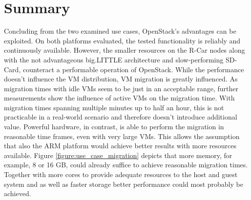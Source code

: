     \section{Summary}
        
        \noindent Concluding from the two examined use cases, OpenStack's advantages can be exploited.
        On both platforms evaluated, the tested functionality is reliably and continuously available.
        However, the smaller resources on the R-Car nodes along with the not advantageous big.LITTLE architecture and slow-performing SD-Card, counteract a performable operation of OpenStack.
        While the performance doesn't influence the VM distribution, VM migration is greatly influenced.
        As migration times with idle VMs seem to be just in an acceptable range, further measurements show the influence of active VMs on the migration time.
        With migration times spanning multiple minutes up to half an hour, this is not practicable in a real-world scenario and therefore doesn't introduce additional value.
        Powerful hardware, in contrast, is able to perform the migration in reasonable time frames, even with very large VMs.
        This allows the assumption that also the ARM platform would achieve better results with more resources available.
        Figure \ref{figure:use_case_migration} depicts that more memory, for example, 8 or 16 GB, could already suffice to achieve reasonable migration times.
        Together with more cores to provide adequate resources to the host and guest system and as well as faster storage better performance could most probably be achieved.
        
        
        
        
        
        
